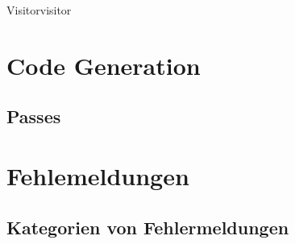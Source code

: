 \begin{Definition}{Visitor}{visitor}
\end{Definition}

\section{Code Generation}
\subsection{Passes}
\section{Fehlemeldungen}
\subsection{Kategorien von Fehlermeldungen}
